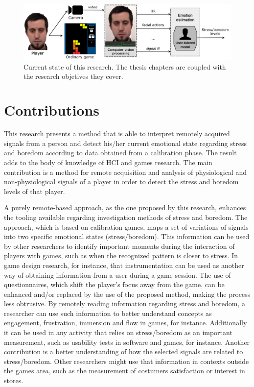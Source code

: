 \begin{figure}[h]
    \centering
    \includegraphics[width=\textwidth]{figures/user-tailored-use.png}
    \caption{Current state of this research. The thesis chapters are coupled with the research objetives they cover.}
    \label{fig:user-tailored-use}
\end{figure}


\section{Contributions}

This research presents a method that is able to interpret remotely acquired signals from a person and detect his/her current emotional state regarding stress and boredom according to data obtained from a calibration phase. The result adds to the body of knowledge of HCI and games research. The main contribution is a method for remote acquisition and analysis of physiological and non-physiological signals of a player in order to detect the stress and boredom levels of that player.

A purely remote-based approach, as the one proposed by this research, enhances the tooling available regarding investigation methods of stress and boredom. The approach, which is based on calibration games, maps a set of variations of signals into two specific emotional states (stress/boredom). This information can be used by other researchers to identify important moments during the interaction of players with games, such as when the recognized pattern is closer to stress. In game design research, for instance, that instrumentation can be used as another way of obtaining information from a user during a game session. The use of questionnaires, which shift the player's focus away from the game, can be enhanced and/or replaced by the use of the proposed method, making the process less obtrusive. By remotely reading information regarding stress and boredom, a researcher can use such information to better understand concepts as engagement, frustration, immersion and flow in games, for instance. Additionally it can be used in any activity that relies on stress/boredom as an important measurement, such as usability tests in software and games, for instance. Another contribution is a better understanding of how the selected signals are related to stress/boredom. Other researchers might use that information in contexts outside the games area, such as the measurement of costumers satisfaction or interest in stores.

